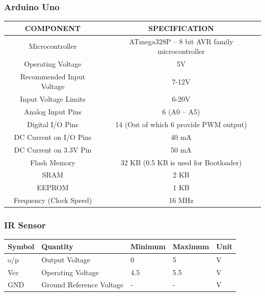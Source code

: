 \documentclass[12pt]{article}
\begin{document}
\subsubsection{Arduino Uno}
\begin{tabular}{|c|c|}
    \hline
    COMPONENT & SPECIFICATION \\
    \hline
    Microcontroller & ATmega328P – 8 bit AVR family microcontroller \\
    \hline
    Operating Voltage & 5V \\
    \hline
    Recommended Input Voltage & 7-12V \\
    \hline
    Input Voltage Limits & 6-20V \\
    \hline
    Analog Input Pins & 6 (A0 – A5) \\
    \hline
    Digital I/O Pins & 14 (Out of which 6 provide PWM output) \\
    \hline
    DC Current on I/O Pins & 40 mA \\
    \hline   
    DC Current on 3.3V Pin & 50 mA \\
    \hline
    Flash Memory & 32 KB (0.5 KB is used for Bootloader) \\
    \hline
    SRAM &2 KB \\
    \hline
    EEPROM & 1 KB \\
    \hline
    Frequency (Clock Speed) & 16 MHz \\
    \hline
\end{tabular}
\subsubsection{IR Sensor}
\begin{tabular}{|l|l|l|l|l|}
\hline
Symbol & Quantity                 & Minimum & Maximum & Unit \\ \hline
o/p    & Output Voltage           & 0       & 5       & V    \\ \hline
Vcc    & Operating Voltage        & 4.5     & 5.5     & V    \\ \hline
GND    & Ground Reference Voltage & -       & -       & V    \\ \hline
\end{tabular}
\end{document}
